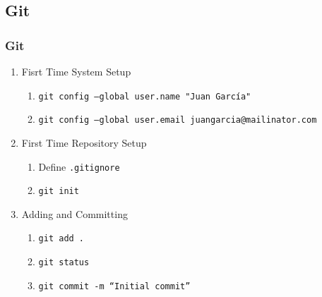 \subsection{Git}
\begin{frame}
\frametitle{Git}
\begin{enumerate}
\item Fisrt Time System Setup
	\begin{enumerate}
 		\item \texttt{git config --global user.name "Juan García"}
 		\item \texttt{git config --global user.email juangarcia@mailinator.com}
	\end{enumerate}
\item First Time Repository Setup
	\begin{enumerate}
		\item Define \texttt{.gitignore}
		\item \texttt{git init}
	\end{enumerate}
\item Adding and Committing
	\begin{enumerate}
		\item \texttt{git add .}
		\item \texttt{git status}
		\item \texttt{git commit -m  ``Initial commit''}
	\end{enumerate}

\end{enumerate}
\end{frame}
